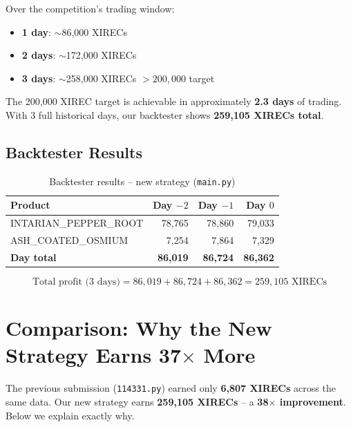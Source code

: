 \documentclass[11pt,a4paper]{article}
\begin{document}
Over the competition's trading window:
\begin{itemize}
    \item \textbf{1 day}: $\sim$86,000 XIRECs
    \item \textbf{2 days}: $\sim$172,000 XIRECs
    \item \textbf{3 days}: $\sim$258,000 XIRECs $> 200{,}000$ target
\end{itemize}

The 200,000 XIREC target is achievable in approximately \textbf{2.3 days} of trading. With 3 full historical days, our backtester shows \textbf{259,105 XIRECs total}.

\subsection{Backtester Results}

\begin{table}[H]
\centering
\caption{Backtester results -- new strategy (\texttt{main.py})}
\begin{tabular}{@{}lrrr@{}}
\toprule
\textbf{Product} & \textbf{Day $-2$} & \textbf{Day $-1$} & \textbf{Day $0$} \\
\midrule
INTARIAN\_PEPPER\_ROOT  & 78,765  & 78,860  & 79,033 \\
ASH\_COATED\_OSMIUM     & 7,254   & 7,864   & 7,329 \\
\midrule
\textbf{Day total}       & \textbf{86,019} & \textbf{86,724} & \textbf{86,362} \\
\bottomrule
\end{tabular}
\end{table}

\begin{equation}
\boxed{\text{Total profit (3 days)} = 86{,}019 + 86{,}724 + 86{,}362 = 259{,}105 \text{ XIRECs}}
\end{equation}

\section{Comparison: Why the New Strategy Earns 37$\times$ More}

The previous submission (\texttt{114331.py}) earned only \textbf{6,807 XIRECs} across the same data. Our new strategy earns \textbf{259,105 XIRECs} -- a \textbf{38$\times$ improvement}. Below we explain exactly why.
\end{document}
